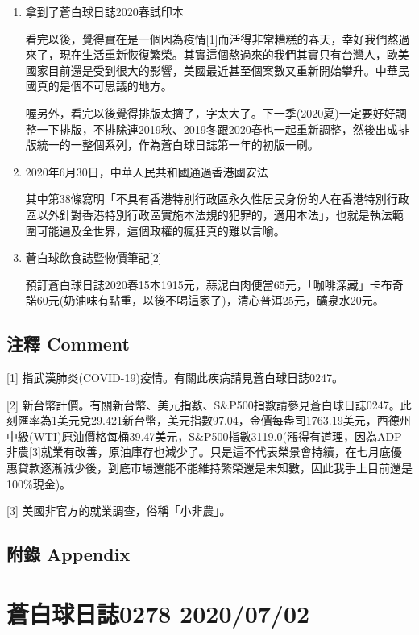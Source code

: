 \documentclass[
]{article}
\begin{document}
\begin{enumerate}
\def\labelenumi{\arabic{enumi}.}
\item
  拿到了蒼白球日誌2020春試印本

  看完以後，覺得實在是一個因為疫情{[}1{]}而活得非常糟糕的春天，幸好我們熬過來了，現在生活重新恢復繁榮。其實這個熬過來的我們其實只有台灣人，歐美國家目前還是受到很大的影響，美國最近甚至個案數又重新開始攀升。中華民國真的是個不可思議的地方。

  喔另外，看完以後覺得排版太擠了，字太大了。下一季(2020夏)一定要好好調整一下排版，不排除連2019秋、2019冬跟2020春也一起重新調整，然後出成排版統一的一整個系列，作為蒼白球日誌第一年的初版一刷。
\item
  2020年6月30日，中華人民共和國通過香港國安法

  其中第38條寫明「不具有香港特別行政區永久性居民身份的人在香港特別行政區以外針對香港特別行政區實施本法規的犯罪的，適用本法」，也就是執法範圍可能遍及全世界，這個政權的瘋狂真的難以言喻。
\item
  蒼白球飲食誌暨物價筆記{[}2{]}

  預訂蒼白球日誌2020春15本1915元，蒜泥白肉便當65元，「咖啡深藏」卡布奇諾60元(奶油味有點重，以後不喝這家了)，清心普洱25元，礦泉水20元。
\end{enumerate}

\hypertarget{ux6ce8ux91cb-comment}{%
\subsection{注釋 Comment}\label{ux6ce8ux91cb-comment}}

{[}1{]} 指武漢肺炎(COVID-19)疫情。有關此疾病請見蒼白球日誌0247。

{[}2{]}
新台幣計價。有關新台幣、美元指數、S\&P500指數請參見蒼白球日誌0247。此刻匯率為1美元兌29.421新台幣，美元指數97.04，金價每盎司1763.19美元，西德州中級(WTI)原油價格每桶39.47美元，S\&P500指數3119.0(漲得有道理，因為ADP非農{[}3{]}就業有改善，原油庫存也減少了。只是這不代表榮景會持續，在七月底優惠貸款逐漸減少後，到底市場還能不能維持繁榮還是未知數，因此我手上目前還是100\%現金)。

{[}3{]} 美國非官方的就業調查，俗稱「小非農」。

\hypertarget{ux9644ux9304-appendix}{%
\subsection{附錄 Appendix}\label{ux9644ux9304-appendix}}

\hypertarget{ux84bcux767dux7403ux65e5ux8a8c0278-20200702}{%
\section{蒼白球日誌0278
2020/07/02}\label{ux84bcux767dux7403ux65e5ux8a8c0278-20200702}}
\end{document}
